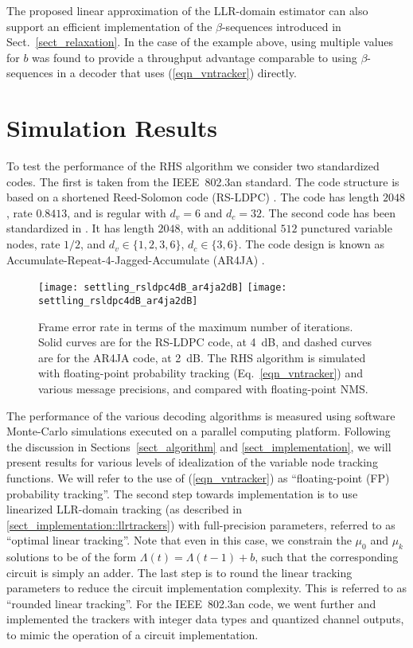 \documentclass[12pt,journal,twoside,draftcls,onecolumn]{IEEEtran}
\begin{document}
	The proposed linear approximation of the LLR-domain estimator can also support an efficient implementation of the $\beta$-sequences introduced in Sect.~\ref{sect_relaxation}. In the case of the example above, using multiple values for $b$ was found to provide a throughput advantage comparable to using $\beta$-sequences in a decoder that uses (\ref{eqn_vntracker}) directly.



\section{Simulation Results}
\label{sect_results}

To test the performance of the RHS algorithm we consider two standardized codes. The first is taken from the IEEE~802.3an standard. The code structure is based on a shortened Reed-Solomon code (RS-LDPC) \cite{djurdjevic:2003}. The code has length $2048$, rate $0.8413$, and is regular with $d_v=6$ and $d_c=32$. The second code has been standardized 
in \cite{ccsds:2007}. 
It has length $2048$, with an additional $512$ punctured variable nodes, rate $1/2$, and $d_v \in \{1,2,3,6\}$, $d_c \in \{3,6\}$.
The code design is known as Accumulate-Repeat-4-Jagged-Accumulate (AR4JA) \cite{divsalar:2005}.

\begin{figure}[tbp]
\begin{center}
\ifCLASSOPTIONdraftcls
	\texttt{[image: settling\_rsldpc4dB\_ar4ja2dB]}
\else
	\texttt{[image: settling\_rsldpc4dB\_ar4ja2dB]}
\fi
\caption{Frame error rate in terms of the maximum number of iterations. Solid curves are for the RS-LDPC code, at 4~dB, and dashed curves are for the AR4JA code, at 2~dB. The RHS algorithm is simulated with floating-point probability tracking (Eq.~\ref{eqn_vntracker}) and various message precisions, and compared with floating-point NMS.}
\label{fig_settlingAll}
\end{center}
\end{figure}


The performance of the various decoding algorithms is measured using software Monte-Carlo simulations executed on a parallel computing platform.
Following the discussion in Sections~\ref{sect_algorithm} and \ref{sect_implementation}, we will present results for various levels of idealization of the variable node tracking functions. We will refer to the use of (\ref{eqn_vntracker}) as ``floating-point (FP) probability tracking''. The second step towards implementation is to use linearized LLR-domain tracking (as described in \ref{sect_implementation::llrtrackers}) with full-precision parameters, referred to as ``optimal linear tracking''. Note that even in this case, we constrain the $\mu_0$ and $\mu_k$ solutions to be of the form $\Lambda(t) = \Lambda(t-1) + b$, such that the corresponding circuit is simply an adder. The last step is to round the linear tracking parameters to reduce the circuit implementation complexity. This is referred to as ``rounded linear tracking''. For the IEEE~802.3an code, we went further and implemented the trackers with integer data types and quantized channel outputs, to mimic the operation of a circuit implementation.
\end{document}
